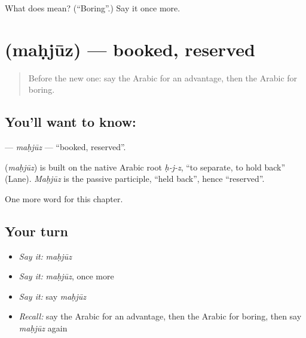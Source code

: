 \begin{tcolorbox}[breakable,colback=teal!4,colframe=teal!35!black,title={Before you move on}]
What does  mean? (\textquotedblleft{}Boring\textquotedblright{}.) Say it once more.
\end{tcolorbox}
\section[\texorpdfstring{\ar{محجوز} (maḥjūz)}{محجوز (maḥjūz)}]{ (maḥjūz) — booked, reserved}

\label{lesson:AR-C270-mahjuz}



\begin{quote}
Before the new one: say the Arabic for an advantage, then the Arabic for boring.
\end{quote}

\subsection*{You'll want to know: }
\textbf{} — \emph{maḥjūz} — \textquotedblleft{}booked, reserved\textquotedblright{}.

\begin{cousinweb}
\textbf{} (\emph{maḥjūz}) is built on the native Arabic root \emph{ḥ-j-z}, \textquotedblleft{}to separate, to hold back\textquotedblright{} (Lane). \emph{Maḥjūz} is the passive participle, \textquotedblleft{}held back\textquotedblright{}, hence \textquotedblleft{}reserved\textquotedblright{}.
\end{cousinweb}

\begin{grammarlens}[title={What you've built}]
One more word for this chapter.
\end{grammarlens}

\subsection*{Your turn}
\begin{itemize}
\raggedright
  \item \emph{Say it:} \emph{maḥjūz}
  \item \emph{Say it:} \emph{maḥjūz}, once more
  \item \emph{Say it:} say \emph{maḥjūz}
  \item \emph{Recall:} say the Arabic for an advantage, then the Arabic for boring, then say \emph{maḥjūz} again
\end{itemize}

